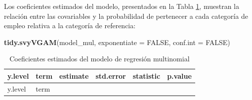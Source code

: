 \documentclass[
  spanish,
  12pt,
]{book}
\newenvironment{Shaded}{\begin{snugshade}}{\end{snugshade}}
\newcommand{\AttributeTok}[1]{\textcolor[rgb]{0.13,0.29,0.53}{#1}}
\newcommand{\ConstantTok}[1]{\textcolor[rgb]{0.56,0.35,0.01}{#1}}
\newcommand{\FunctionTok}[1]{\textcolor[rgb]{0.13,0.29,0.53}{\textbf{#1}}}
\newcommand{\NormalTok}[1]{#1}
\begin{document}
Los coeficientes estimados del modelo, presentados en la Tabla \ref{tab:tab-multinomial-coef}, muestran la relación entre las covariables y la probabilidad de pertenecer a cada categoría de empleo relativa a la categoría de referencia:

\begin{Shaded}
\begin{Highlighting}[]
\FunctionTok{tidy.svyVGAM}\NormalTok{(model\_mul, }\AttributeTok{exponentiate =} \ConstantTok{FALSE}\NormalTok{, }\AttributeTok{conf.int =} \ConstantTok{FALSE}\NormalTok{)}
\end{Highlighting}
\end{Shaded}

\begin{longtable}[]{@{}
  >{\raggedright\arraybackslash}p{}
  >{\centering\arraybackslash}p{}
  >{\centering\arraybackslash}p{}
  >{\centering\arraybackslash}p{}
  >{\centering\arraybackslash}p{}
  >{\centering\arraybackslash}p{}@{}}
\caption{\label{tab:tab-multinomial-coef}Coeficientes estimados del modelo de regresión multinomial}\tabularnewline
\toprule\noalign{}
\begin{minipage}[b]{\linewidth}\raggedright
y.level
\end{minipage} & \begin{minipage}[b]{\linewidth}\centering
term
\end{minipage} & \begin{minipage}[b]{\linewidth}\centering
estimate
\end{minipage} & \begin{minipage}[b]{\linewidth}\centering
std.error
\end{minipage} & \begin{minipage}[b]{\linewidth}\centering
statistic
\end{minipage} & \begin{minipage}[b]{\linewidth}\centering
p.value
\end{minipage} \\
\midrule\noalign{}
\endfirsthead
\toprule\noalign{}
\begin{minipage}[b]{\linewidth}\raggedright
y.level
\end{minipage} & \begin{minipage}[b]{\linewidth}\centering
term

\end{minipage}
\end{longtable}
\end{document}
